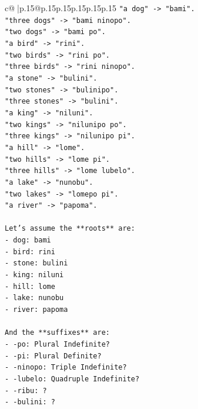\documentclass{article}
\begin{document}
{\begin{supertabular}{c@{$\;$}|p{.15\linewidth}@{}p{.15\linewidth}p{.15\linewidth}p{.15\linewidth}p{.15\linewidth}p{.15\linewidth}}
{{{\texttt{"a dog" {-}> "bami".} \\
\texttt{"three dogs" {-}> "bami ninopo".} \\
\texttt{"two dogs" {-}> "bami po".} \\
\texttt{"a bird" {-}> "rini".} \\
\texttt{"two birds" {-}> "rini po".} \\
\texttt{"three birds" {-}> "rini ninopo".} \\
\texttt{"a stone" {-}> "bulini".} \\
\texttt{"two stones" {-}> "bulinipo".} \\
\texttt{"three stones" {-}> "bulini".} \\
\texttt{"a king" {-}> "niluni".} \\
\texttt{"two kings" {-}> "nilunipo po".} \\
\texttt{"three kings" {-}> "nilunipo pi".} \\
\texttt{"a hill" {-}> "lome".} \\
\texttt{"two hills" {-}> "lome pi".} \\
\texttt{"three hills" {-}> "lome lubelo".} \\
\texttt{"a lake" {-}> "nunobu".} \\
\texttt{"two lakes" {-}> "lomepo pi".} \\
\texttt{"a river" {-}> "papoma".} \\
\\ 
\texttt{Let's assume the **roots** are:} \\
\texttt{{-} dog: bami} \\
\texttt{{-} bird: rini} \\
\texttt{{-} stone: bulini} \\
\texttt{{-} king: niluni} \\
\texttt{{-} hill: lome} \\
\texttt{{-} lake: nunobu} \\
\texttt{{-} river: papoma} \\
\\ 
\texttt{And the **suffixes** are:} \\
\texttt{{-} {-}po: Plural Indefinite?} \\
\texttt{{-} {-}pi: Plural Definite?} \\
\texttt{{-} {-}ninopo: Triple Indefinite?} \\
\texttt{{-} {-}lubelo: Quadruple Indefinite?} \\
\texttt{{-} {-}ribu: ?} \\
\texttt{{-} {-}bulini: ?} \\
}}}
\end{supertabular}}
\end{document}
